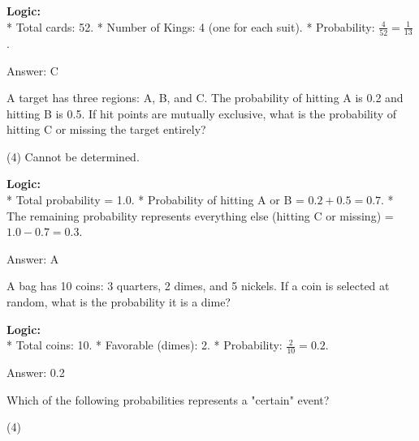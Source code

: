 \documentclass[11pt,paper=a4,answers]{exam}
\begin{document}
\begin{questions}
\begin{solution}
\textbf{Logic:} \\
* Total cards: 52.
* Number of Kings: 4 (one for each suit).
* Probability: $\frac{4}{52} = \frac{1}{13}$.

\vspace{30pt}

Answer: \colorbox{yellow!100}{C}
\end{solution}

\vspace{60pt}

\question
A target has three regions: A, B, and C. The probability of hitting A is 0.2 and hitting B is 0.5. If hit points are mutually exclusive, what is the probability of hitting C or missing the target entirely?
\begin{tasks}(4)
    \task Cannot be determined.
\end{tasks}

\begin{solution}
\textbf{Logic:} \\
* Total probability = 1.0.
* Probability of hitting A or B = $0.2 + 0.5 = 0.7$.
* The remaining probability represents everything else (hitting C or missing) = $1.0 - 0.7 = 0.3$.

\vspace{30pt}

Answer: \colorbox{yellow!100}{A}
\end{solution}

\vspace{60pt}

\question
A bag has 10 coins: 3 quarters, 2 dimes, and 5 nickels. If a coin is selected at random, what is the probability it is a dime?

\begin{solution}
\textbf{Logic:} \\
* Total coins: 10.
* Favorable (dimes): 2.
* Probability: $\frac{2}{10} = 0.2$.

\vspace{30pt}

Answer: \colorbox{yellow!100}{0.2}
\end{solution}

\vspace{60pt}

\question
Which of the following probabilities represents a "certain" event?
\begin{tasks}(4)
\end{tasks}


\end{questions}
\end{document}
